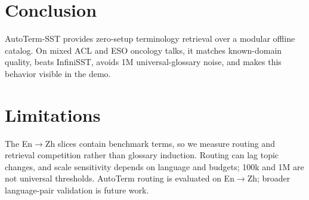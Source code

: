 \section{Conclusion}

AutoTerm-SST provides zero-setup terminology retrieval over a modular offline
catalog. On mixed ACL and ESO oncology talks, it matches known-domain quality,
beats InfiniSST, avoids 1M universal-glossary noise, and makes this behavior
visible in the demo.

\section*{Limitations}
\label{sec:limitations}

The En$\rightarrow$Zh slices contain benchmark terms, so we measure routing and
retrieval competition rather than glossary induction. Routing can lag topic
changes, and scale sensitivity depends on language and budgets; 100k and 1M
are not universal thresholds. AutoTerm routing is evaluated on
En$\rightarrow$Zh; broader language-pair validation is future work.
